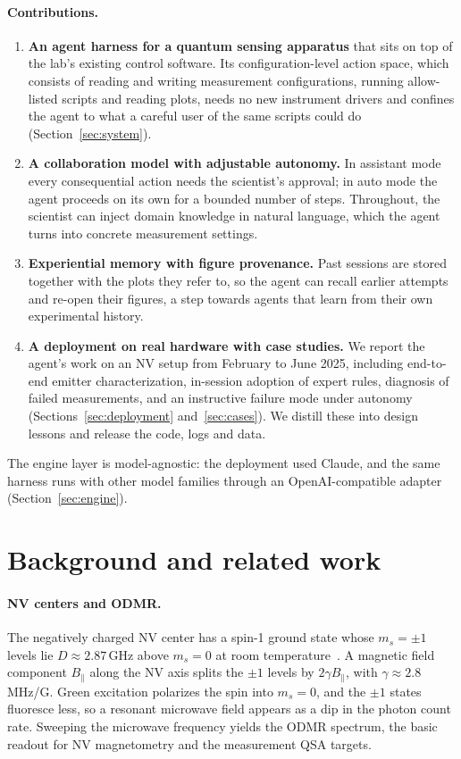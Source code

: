 \documentclass[10pt]{article}
\newcommand{\qsa}{QSA}
\begin{document}
\paragraph{Contributions.}
\begin{enumerate}[leftmargin=*]
  \item \textbf{An agent harness for a quantum sensing apparatus} that sits on top of the lab's existing control software. Its configuration-level action space, which consists of reading and writing measurement configurations, running allow-listed scripts and reading plots, needs no new instrument drivers and confines the agent to what a careful user of the same scripts could do (Section~\ref{sec:system}).
  \item \textbf{A collaboration model with adjustable autonomy.} In assistant mode every consequential action needs the scientist's approval; in auto mode the agent proceeds on its own for a bounded number of steps. Throughout, the scientist can inject domain knowledge in natural language, which the agent turns into concrete measurement settings.
  \item \textbf{Experiential memory with figure provenance.} Past sessions are stored together with the plots they refer to, so the agent can recall earlier attempts and re-open their figures, a step towards agents that learn from their own experimental history.
  \item \textbf{A deployment on real hardware with case studies.} We report the agent's work on an NV setup from February to June 2025, including end-to-end emitter characterization, in-session adoption of expert rules, diagnosis of failed measurements, and an instructive failure mode under autonomy (Sections~\ref{sec:deployment} and~\ref{sec:cases}). We distill these into design lessons and release the code, logs and data.
\end{enumerate}
The engine layer is model-agnostic: the deployment used Claude, and the same harness runs with other model families through an OpenAI-compatible adapter (Section~\ref{sec:engine}).

\section{Background and related work}
\label{sec:related}

\paragraph{NV centers and ODMR.}
The negatively charged NV center has a spin-1 ground state whose $m_s=\pm1$ levels lie $D\approx2.87$\,GHz above $m_s=0$ at room temperature~\cite{doherty2013nv}.
A magnetic field component $B_\parallel$ along the NV axis splits the $\pm1$ levels by $2\gamma B_\parallel$, with $\gamma\approx2.8$\,MHz/G.
Green excitation polarizes the spin into $m_s=0$, and the $\pm1$ states fluoresce less, so a resonant microwave field appears as a dip in the photon count rate.
Sweeping the microwave frequency yields the ODMR spectrum, the basic readout for NV magnetometry and the measurement \qsa{} targets.
\end{document}
